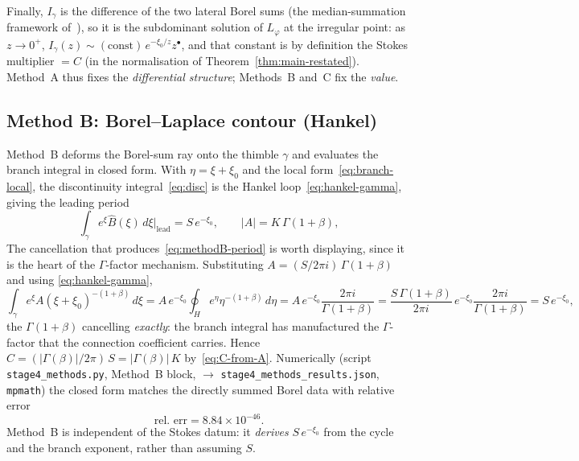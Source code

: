 \documentclass[11pt,reqno]{amsart}
\theoremstyle{plain}
\theoremstyle{definition}
\newcommand{\Bhat}{\widehat{B}}
\newcommand{\Lphi}{L_{\varphi}}
\newcommand{\xizero}{\xi_0}
\providecommand{\C}{}\renewcommand{\C}{C}
\begin{document}
Finally, $I_\gamma$ is the difference of the two lateral Borel sums (the median-summation
framework of~\cite{LodayRichaud}), so it is the subdominant
solution of $\Lphi$ at the irregular point: as $z\to0^+$, $I_\gamma(z)\sim(\text{const})\,
e^{-\xizero/z}z^{\bullet}$, and that constant is by definition the Stokes multiplier
$=\C$ (in the normalisation of Theorem~\ref{thm:main-restated}). Method~A thus fixes the
\emph{differential structure}; Methods~B and~C fix the \emph{value}.

\subsection{Method B: Borel--Laplace contour (Hankel)}\label{sub:methodB}
Method~B deforms the Borel-sum ray onto the thimble $\gamma$ and evaluates the branch integral in
closed form. With $\eta=\xi+\xizero$ and the local form~\eqref{eq:branch-local}, the
discontinuity integral~\eqref{eq:disc} is the Hankel loop~\eqref{eq:hankel-gamma}, giving the
leading period
\begin{equation}\label{eq:methodB-period}
  \int_\gamma e^{\xi}\Bhat(\xi)\,d\xi\Big|_{\text{lead}}=S\,e^{-\xizero},\qquad
  \lvert A\rvert=K\,\Gamma(1+\beta),
\end{equation}
The cancellation that produces~\eqref{eq:methodB-period} is worth displaying, since it is the heart
of the $\Gamma$-factor mechanism. Substituting $A=(S/2\pi i)\,\Gamma(1+\beta)$ and using
\eqref{eq:hankel-gamma},
\begin{equation}\label{eq:methodB-chain}
  \int_\gamma e^{\xi}A(\xi+\xizero)^{-(1+\beta)}\,d\xi
  =A\,e^{-\xizero}\!\oint_{H}e^{\eta}\eta^{-(1+\beta)}\,d\eta
  =A\,e^{-\xizero}\frac{2\pi i}{\Gamma(1+\beta)}
  =\frac{S\,\Gamma(1+\beta)}{2\pi i}\,e^{-\xizero}\frac{2\pi i}{\Gamma(1+\beta)}
  =S\,e^{-\xizero},
\end{equation}
the $\Gamma(1+\beta)$ cancelling \emph{exactly}: the branch integral has manufactured the
$\Gamma$-factor that the connection coefficient carries. Hence
$\C=(\lvert\Gamma(\beta)\rvert/2\pi)\,S=\lvert\Gamma(\beta)\rvert\,K$
by~\eqref{eq:C-from-A}. Numerically (script \texttt{stage4\_methods.py}, Method~B block,
$\to$ \texttt{stage4\_methods\_results.json}, \texttt{mpmath}) the closed form
matches the directly summed Borel data with relative error
\begin{equation}\label{eq:methodB-err}
  \text{rel.\ err}=8.84\times10^{-46}.
\end{equation}
Method~B is independent of the Stokes datum: it \emph{derives} $S\,e^{-\xizero}$ from the cycle and
the branch exponent, rather than assuming $S$.
\end{document}
